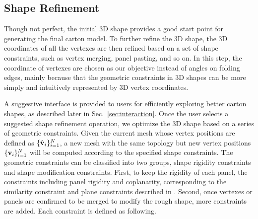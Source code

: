 


\subsection{Shape Refinement}\label{sec:refinement}

Though not perfect, the initial 3D shape provides a good start point for generating the final carton model. 
%
To further refine the 3D shape, the 3D coordinates of all the vertexes are then refined based on a set of shape constraints, such as vertex merging, panel pasting, and so on.
%
In this step, the coordinate of vertexes are chosen as our objective instead of angles on folding edges, mainly because that the geometric constraints in 3D shapes can be more simply and intuitively represented by 3D vertex coordinates.



A suggestive interface is provided to users for efficiently exploring better carton shapes, as described later in Sec.~\ref{sec:interaction}. 
%
Once the user selects a suggested shape refinement operation, we optimize the 3D shape based on a series of geometric constraints.
Given the current mesh whose vertex positions are defined as $\{\hat{\mathbf{v}}_i\}^{N}_{i=1}$, a new mesh with the same topology but new vertex positions $\{\mathbf{v}_i\}^{N}_{i=1}$ will be computed according to the specified shape constraints.
%
The geometric constraints can be classified into two groups, shape rigidity constraints and shape modification constraints.
% 
First, to keep the rigidity of each panel, the constraints including panel rigidity and coplanarity, corresponding to the similarity constraint and plane constraints described in \cite{Bouaziz:2012:SSD:2346796.2346802}. 
%
Second, once vertexes or panels are confirmed to be merged to modify the rough shape, more constraints are added. 
%
Each constraint is defined as following.  
 

